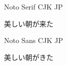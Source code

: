 \documentclass[uplatex,a4paper]{jsarticle}
\begin{document}
Noto Serif CJK JP

美しい朝が来た

\sffamily
Noto Sans CJK JP

美しい朝がきた
\end{document}
